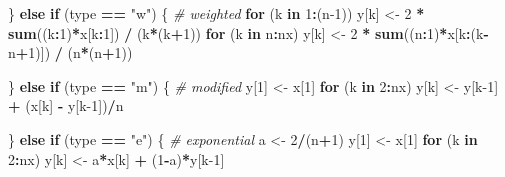 \documentclass[
]{article}
\newenvironment{Shaded}{\begin{snugshade}}{\end{snugshade}}
\newcommand{\CommentTok}[1]{\textcolor[rgb]{0.56,0.35,0.01}{\textit{#1}}}
\newcommand{\ControlFlowTok}[1]{\textcolor[rgb]{0.13,0.29,0.53}{\textbf{#1}}}
\newcommand{\DecValTok}[1]{\textcolor[rgb]{0.00,0.00,0.81}{#1}}
\newcommand{\FunctionTok}[1]{\textcolor[rgb]{0.13,0.29,0.53}{\textbf{#1}}}
\newcommand{\NormalTok}[1]{#1}
\newcommand{\OtherTok}[1]{\textcolor[rgb]{0.56,0.35,0.01}{#1}}
\newcommand{\SpecialCharTok}[1]{\textcolor[rgb]{0.81,0.36,0.00}{\textbf{#1}}}
\newcommand{\StringTok}[1]{\textcolor[rgb]{0.31,0.60,0.02}{#1}}
\begin{document}
\begin{Shaded}
\begin{Highlighting}[]
\NormalTok{    \} }\ControlFlowTok{else} \ControlFlowTok{if}\NormalTok{ (type }\SpecialCharTok{==} \StringTok{"w"}\NormalTok{) \{  }\CommentTok{\# weighted}
        \ControlFlowTok{for}\NormalTok{ (k }\ControlFlowTok{in} \DecValTok{1}\SpecialCharTok{:}\NormalTok{(n}\DecValTok{{-}1}\NormalTok{))  y[k] }\OtherTok{\textless{}{-}} \DecValTok{2} \SpecialCharTok{*} \FunctionTok{sum}\NormalTok{((k}\SpecialCharTok{:}\DecValTok{1}\NormalTok{)}\SpecialCharTok{*}\NormalTok{x[k}\SpecialCharTok{:}\DecValTok{1}\NormalTok{]) }\SpecialCharTok{/}\NormalTok{ (k}\SpecialCharTok{*}\NormalTok{(k}\SpecialCharTok{+}\DecValTok{1}\NormalTok{))}
        \ControlFlowTok{for}\NormalTok{ (k }\ControlFlowTok{in}\NormalTok{ n}\SpecialCharTok{:}\NormalTok{nx)     y[k] }\OtherTok{\textless{}{-}} \DecValTok{2} \SpecialCharTok{*} \FunctionTok{sum}\NormalTok{((n}\SpecialCharTok{:}\DecValTok{1}\NormalTok{)}\SpecialCharTok{*}\NormalTok{x[k}\SpecialCharTok{:}\NormalTok{(k}\SpecialCharTok{{-}}\NormalTok{n}\SpecialCharTok{+}\DecValTok{1}\NormalTok{)]) }\SpecialCharTok{/}\NormalTok{ (n}\SpecialCharTok{*}\NormalTok{(n}\SpecialCharTok{+}\DecValTok{1}\NormalTok{))}

\NormalTok{    \} }\ControlFlowTok{else} \ControlFlowTok{if}\NormalTok{ (type }\SpecialCharTok{==} \StringTok{"m"}\NormalTok{) \{  }\CommentTok{\# modified}
\NormalTok{        y[}\DecValTok{1}\NormalTok{] }\OtherTok{\textless{}{-}}\NormalTok{ x[}\DecValTok{1}\NormalTok{]}
        \ControlFlowTok{for}\NormalTok{ (k }\ControlFlowTok{in} \DecValTok{2}\SpecialCharTok{:}\NormalTok{nx)     y[k] }\OtherTok{\textless{}{-}}\NormalTok{ y[k}\DecValTok{{-}1}\NormalTok{] }\SpecialCharTok{+}\NormalTok{ (x[k] }\SpecialCharTok{{-}}\NormalTok{ y[k}\DecValTok{{-}1}\NormalTok{])}\SpecialCharTok{/}\NormalTok{n}

\NormalTok{    \} }\ControlFlowTok{else} \ControlFlowTok{if}\NormalTok{ (type }\SpecialCharTok{==} \StringTok{"e"}\NormalTok{) \{  }\CommentTok{\# exponential}
\NormalTok{        a }\OtherTok{\textless{}{-}} \DecValTok{2}\SpecialCharTok{/}\NormalTok{(n}\SpecialCharTok{+}\DecValTok{1}\NormalTok{)}
\NormalTok{        y[}\DecValTok{1}\NormalTok{] }\OtherTok{\textless{}{-}}\NormalTok{ x[}\DecValTok{1}\NormalTok{]}
        \ControlFlowTok{for}\NormalTok{ (k }\ControlFlowTok{in} \DecValTok{2}\SpecialCharTok{:}\NormalTok{nx)     y[k] }\OtherTok{\textless{}{-}}\NormalTok{ a}\SpecialCharTok{*}\NormalTok{x[k] }\SpecialCharTok{+}\NormalTok{ (}\DecValTok{1}\SpecialCharTok{{-}}\NormalTok{a)}\SpecialCharTok{*}\NormalTok{y[k}\DecValTok{{-}1}\NormalTok{]}


\end{Highlighting}
\end{Shaded}
\end{document}
